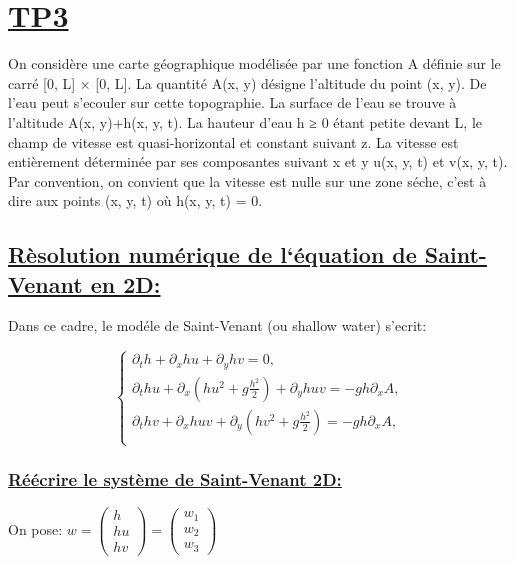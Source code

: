 \chapter[TP3]{\uline{TP3}}

On consid\`ere une carte g\'eographique mod\'elis\'ee par une fonction A d\'efinie sur le carr\'e [0, L] × [0, L]. La quantité A(x, y) d\'esigne
l’altitude du point (x, y). De l’eau peut s’ecouler sur cette topographie. La surface de l’eau se trouve \`a l’altitude A(x, y)+h(x, y, t).
La hauteur d’eau h ≥ 0 étant petite devant L, le champ de vitesse est quasi-horizontal et constant suivant z. La vitesse est enti\`erement d\'etermin\'ee par ses composantes suivant x et y u(x, y, t) et v(x, y, t). Par convention, on convient que la vitesse est
nulle sur une zone s\'eche, c’est \`a dire aux points (x, y, t) o\`u h(x, y, t) = 0. 


\section[R\`esolution num\'erique de l`\'equation de Saint-Venant en 2D]{\uline{R\`esolution num\'erique de l`\'equation de Saint-Venant en 2D:}}

Dans ce cadre, le mod\'ele de Saint-Venant (ou shallow water) s’ecrit:

\begin{equation}
\label{systeme}
\left \lbrace \begin{array}{rl}
\partial_t h +  \partial_x hu + \partial_y hv = 0, \\
\partial_t hu  +  \partial_x (h u^2 + g \frac{h^2}{2}) + \partial_y huv = -gh\partial_xA, \\
\partial_t hv  + \partial_x huv +  \partial_y (h v^2 + g \frac{h^2}{2})  = -gh\partial_xA, \\

\end{array}\right.
\end{equation} 

\subsection[R\'e\'ecrire le syst\`eme de Saint-Venant 2D]{\uline{R\'e\'ecrire le syst\`eme de Saint-Venant 2D:}}

On pose: $w = \begin{pmatrix}
h\\
hu \\
hv
\end{pmatrix}= \begin{pmatrix}
w_1\\
w_2 \\
w_3
\end{pmatrix}$

